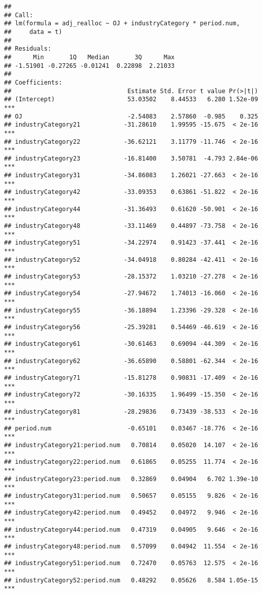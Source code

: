 \documentclass[
]{article}
\begin{document}
\begin{verbatim}
## 
## Call:
## lm(formula = adj_realloc ~ OJ + industryCategory * period.num, 
##     data = t)
## 
## Residuals:
##      Min       1Q   Median       3Q      Max 
## -1.51901 -0.27265 -0.01241  0.22898  2.21033 
## 
## Coefficients:
##                                Estimate Std. Error t value Pr(>|t|)    
## (Intercept)                    53.03502    8.44533   6.280 1.52e-09 ***
## OJ                             -2.54083    2.57860  -0.985    0.325    
## industryCategory21            -31.28610    1.99595 -15.675  < 2e-16 ***
## industryCategory22            -36.62121    3.11779 -11.746  < 2e-16 ***
## industryCategory23            -16.81400    3.50781  -4.793 2.84e-06 ***
## industryCategory31            -34.86083    1.26021 -27.663  < 2e-16 ***
## industryCategory42            -33.09353    0.63861 -51.822  < 2e-16 ***
## industryCategory44            -31.36493    0.61620 -50.901  < 2e-16 ***
## industryCategory48            -33.11469    0.44897 -73.758  < 2e-16 ***
## industryCategory51            -34.22974    0.91423 -37.441  < 2e-16 ***
## industryCategory52            -34.04918    0.80284 -42.411  < 2e-16 ***
## industryCategory53            -28.15372    1.03210 -27.278  < 2e-16 ***
## industryCategory54            -27.94672    1.74013 -16.060  < 2e-16 ***
## industryCategory55            -36.18894    1.23396 -29.328  < 2e-16 ***
## industryCategory56            -25.39281    0.54469 -46.619  < 2e-16 ***
## industryCategory61            -30.61463    0.69094 -44.309  < 2e-16 ***
## industryCategory62            -36.65890    0.58801 -62.344  < 2e-16 ***
## industryCategory71            -15.81278    0.90831 -17.409  < 2e-16 ***
## industryCategory72            -30.16335    1.96499 -15.350  < 2e-16 ***
## industryCategory81            -28.29836    0.73439 -38.533  < 2e-16 ***
## period.num                     -0.65101    0.03467 -18.776  < 2e-16 ***
## industryCategory21:period.num   0.70814    0.05020  14.107  < 2e-16 ***
## industryCategory22:period.num   0.61865    0.05255  11.774  < 2e-16 ***
## industryCategory23:period.num   0.32869    0.04904   6.702 1.39e-10 ***
## industryCategory31:period.num   0.50657    0.05155   9.826  < 2e-16 ***
## industryCategory42:period.num   0.49452    0.04972   9.946  < 2e-16 ***
## industryCategory44:period.num   0.47319    0.04905   9.646  < 2e-16 ***
## industryCategory48:period.num   0.57099    0.04942  11.554  < 2e-16 ***
## industryCategory51:period.num   0.72470    0.05763  12.575  < 2e-16 ***
## industryCategory52:period.num   0.48292    0.05626   8.584 1.05e-15 ***

\end{verbatim}
\end{document}
